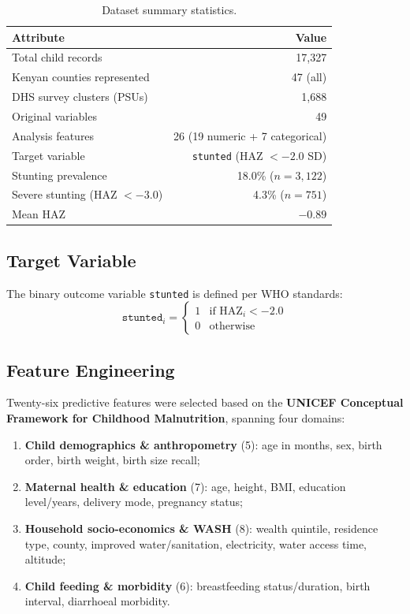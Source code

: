 \documentclass[12pt, a4paper]{article}
\begin{document}
\begin{table}[H]
\centering
\caption{Dataset summary statistics.}
\label{tab:data-summary}
\begin{tabular}{lr}
\toprule
\textbf{Attribute} & \textbf{Value} \\
\midrule
Total child records            & 17,327 \\
Kenyan counties represented    & 47 (all) \\
DHS survey clusters (PSUs)     & 1,688 \\
Original variables             & 49 \\
Analysis features              & 26 (19 numeric + 7 categorical) \\
Target variable                & \texttt{stunted} (HAZ $< -2.0$ SD) \\
Stunting prevalence            & 18.0\% ($n = 3{,}122$) \\
Severe stunting (HAZ $< -3.0$) & 4.3\% ($n = 751$) \\
Mean HAZ                       & $-0.89$ \\
\bottomrule
\end{tabular}
\end{table}

\subsection{Target Variable}

The binary outcome variable \texttt{stunted} is defined per WHO standards:
\[
\texttt{stunted}_i = 
\begin{cases}
1 & \text{if } \text{HAZ}_i < -2.0 \\
0 & \text{otherwise}
\end{cases}
\]

\subsection{Feature Engineering}

Twenty-six predictive features were selected based on the \textbf{UNICEF Conceptual Framework for Childhood Malnutrition}, spanning four domains:

\begin{enumerate}
    \item \textbf{Child demographics \& anthropometry} (5): age in months, sex, birth order, birth weight, birth size recall;
    \item \textbf{Maternal health \& education} (7): age, height, BMI, education level/years, delivery mode, pregnancy status;
    \item \textbf{Household socio-economics \& WASH} (8): wealth quintile, residence type, county, improved water/sanitation, electricity, water access time, altitude;
    \item \textbf{Child feeding \& morbidity} (6): breastfeeding status/duration, birth interval, diarrhoeal morbidity.
\end{enumerate}
\end{document}
